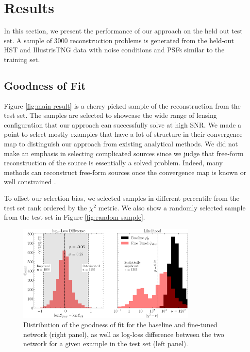 \section{Results}\label{sec:results}


In this section, we present the performance of our approach 
on the held out test set. A sample of 3000 reconstruction 
problems is generated from the held-out HST and IllustrisTNG data 
with noise conditions and PSFs similar to the training set.

\subsection{Goodness of Fit}
Figure \ref{fig:main result} is a cherry picked sample of the reconstruction from the test set. 
The samples are selected to showcase the wide range of lensing configuration that 
our approach can successfully solve at high SNR. We made a point to select mostly 
examples that have a lot of structure in their convergence map to distinguish 
our approach from existing analytical methods. We did not make an 
emphasis in selecting complicated sources since we judge that 
free-form reconstruction of the source is essentially a solved problem. 
Indeed, many methods can reconstruct free-form sources 
once the convergence map is known or well constrained 
\citep{Warren2003,Suyu2006,Vegetti2009,Birrer2018,Morningstar2019,Galan2021,Karchev2022,Mishra-Sharma2022}.

To offset our selection bias, we selected samples in different percentile from the
test set rank ordered by the $\chi^2$ metric. 
We also show a randomly selected sample from the test set in Figure \ref{fig:random sample}.

\begin{figure}[th!]
        \centering
        \includegraphics[width=0.8\textwidth]{figures/loss_and_likelihood}
        \caption{Distribution of the goodness of fit for the baseline and fine-tuned network (right panel), as well as log-loss difference between the two network for a given example in the test set (left panel).
}
        \label{fig:loss and chi squared}
\end{figure}


